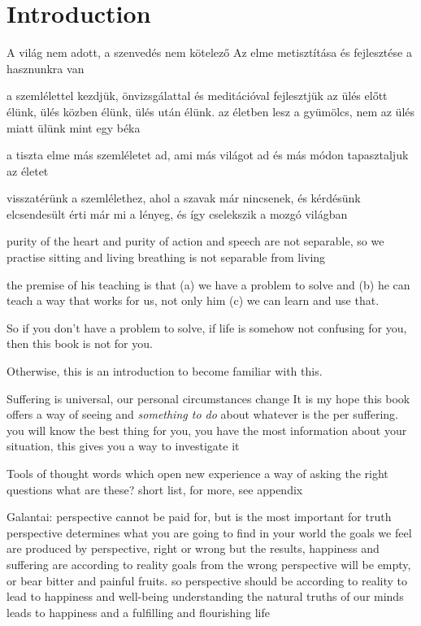 \chapter{Introduction}

A világ nem adott, a szenvedés nem kötelező Az elme metisztítása és
fejlesztése a hasznunkra van

a szemlélettel kezdjük, önvizsgálattal és meditációval fejlesztjük az
ülés előtt élünk, ülés közben élünk, ülés után élünk. az életben lesz a
gyümölcs, nem az ülés miatt ülünk mint egy béka

a tiszta elme más szemléletet ad, ami más világot ad és más módon
tapasztaljuk az életet

visszatérünk a szemlélethez, ahol a szavak már nincsenek, és kérdésünk
elcsendesült érti már mi a lényeg, és így cselekszik a mozgó világban

purity of the heart and purity of action and speech are not separable,
so we practise sitting and living breathing is not separable from living

the premise of his teaching is that (a) we have a problem to solve and
(b) he can teach a way that works for us, not only him (c) we can learn
and use that.

So if you don't have a problem to solve, if life is somehow not
confusing for you, then this book is not for you.

Otherwise, this is an introduction to become familiar with this.

Suffering is universal, our personal circumstances change It is my hope
this book offers a way of seeing and \emph{something to do} about
whatever is the per suffering. you will know the best thing for you, you
have the most information about your situation, this gives you a way to
investigate it

Tools of thought words which open new experience a way of asking the
right questions what are these? short list, for more, see appendix

Galantai: perspective cannot be paid for, but is the most important for
truth perspective determines what you are going to find in your world
the goals we feel are produced by perspective, right or wrong but the
results, happiness and suffering are according to reality goals from the
wrong perspective will be empty, or bear bitter and painful fruits. so
perspective should be according to reality to lead to happiness and
well-being understanding the natural truths of our minds leads to
happiness and a fulfilling and flourishing life

